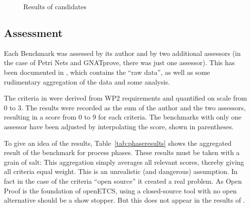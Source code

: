  \begin{figure}
  \centering
  \caption{Results of candidates}
  \label{fig:results}
\end{figure}

\subsection{Assessment}
\label{sec:assessment}

Each Benchmark was assessed by its author and by two additional assessors (in the case of Petri Nets and GNATprove, there was just one assessor).  This has been documented in \citep{WP7_O719}, which contains the ``raw data'', as well as some rudimentary aggregation of the data and some analysis.

The criteria in \citep{WP7_O719} were derived from WP2 requirements and quantified on scale from 0 to 3.  The results were recorded as the sum of the author and the two assessors, resulting in a score from 0 to 9 for each criteria.  The benchmarks with only one assessor have been adjusted by interpolating the score, shown in parentheses.

To give an idea of the results, Table~\ref{tab:phaseresults} shows the aggregated result of the benchmark for process phases.  These results must be taken with a grain of salt: This aggregation simply averages all relevant scores, thereby giving all criteria equal weight.  This is an unrealistic (and dangerous) assumption.  In fact in the case of the criteria ``open source'' it created a real problem.  As Open Proof is the foundation of openETCS, using a closed-source tool with no open alternative should be a show stopper.  But this does not appear in the results of \citep{WP7_O719}.

